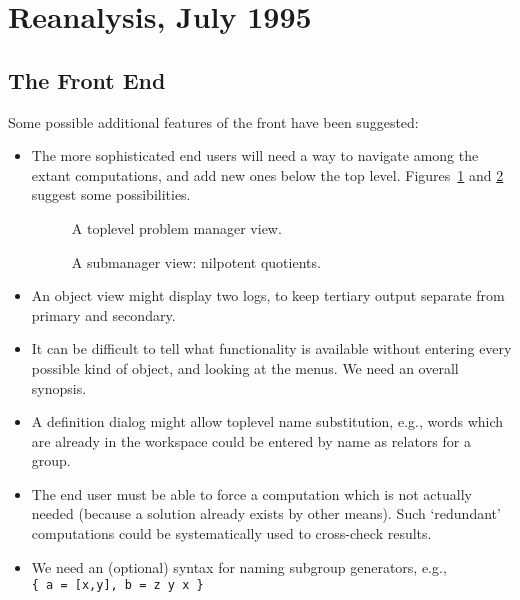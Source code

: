 




\section{Reanalysis, July 1995}

\subsection{The Front End}

Some possible additional features of the front have been suggested:

\begin{itemize}

\item
The more sophisticated end users will need a way to navigate among the
extant computations, and add new ones below the top level. Figures~\ref{WPview}
and \ref{NQview} suggest some possibilities.

\begin{figure}[hbtp]
\caption{A toplevel problem manager view.}\label{WPview}
\end{figure}

\begin{figure}[hbtp]
\caption{A submanager view: nilpotent quotients.}\label{NQview}
\end{figure}

\item
An object view might display two logs, to keep tertiary output
separate from primary and secondary.

\item
It can be difficult to tell what functionality is available without
entering every possible kind of object, and looking at the menus. We
need an overall synopsis.

\item
A definition dialog might allow toplevel name substitution, e.g.,
words which are already in the workspace could be entered by name as
relators for a group.

\item
The end user must be able to force a computation which is not actually
needed (because a solution already exists by other means). Such
`redundant' computations could be systematically used to cross-check
results.

\item
We need an (optional) syntax for naming subgroup generators, e.g.,
{\tt \{~a~=~[x,y],~b~=~z~y~x~\}}

\end{itemize}


